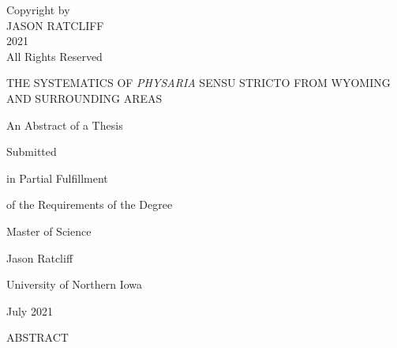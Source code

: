 \thispagestyle{empty}
\vspace*{\fill}         %
\begin{center}          
  Copyright by\\
  JASON RATCLIFF\\
  2021\\
  All Rights Reserved
\end{center}
\vspace*{\fill}
\clearpage

\clearpage
\thispagestyle{empty}
\begin{center} 
THE SYSTEMATICS OF \textit{PHYSARIA} SENSU STRICTO FROM WYOMING 
AND SURROUNDING AREAS
\end{center}
\vspace{120pt}
\begin{center}
  An Abstract of a Thesis

  Submitted

  in Partial Fulfillment

  of the Requirements of the Degree
  
  Master of Science
\end{center}
\vspace{120pt}
\begin{center}
  Jason Ratcliff
  
  University of Northern Iowa
  
  July 2021
\end{center}
\clearpage

\thispagestyle{empty}
\begin{center}
ABSTRACT
\end{center}


